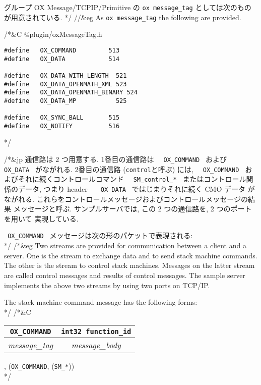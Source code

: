 グループ OX Message/TCPIP/Primitive の
{\tt ox message\_tag} としては次のものが用意されている.
*/
//&eg \noindent As {\tt ox message\_tag} the following are provided.

/*&C
@plugin/oxMessageTag.h
\begin{verbatim}
#define   OX_COMMAND         513
#define   OX_DATA            514

#define   OX_DATA_WITH_LENGTH  521
#define   OX_DATA_OPENMATH_XML 523
#define   OX_DATA_OPENMATH_BINARY 524
#define   OX_DATA_MP           525

#define   OX_SYNC_BALL       515
#define   OX_NOTIFY          516
\end{verbatim}
*/

/*&jp
通信路は 2 つ用意する.
1番目の通信路は
\verb+  OX_COMMAND +
および
\verb+   OX_DATA +
がながれる.
2番目の通信路 ({\tt control}と呼ぶ) には,
\verb+  OX_COMMAND + およびそれに続くコントロールコマンド
\verb+  SM_control_* +
またはコントロール関係のデータ, つまり header
\verb+   OX_DATA + ではじまりそれに続く CMO データ
がながれる.
これらをコントロールメッセージおよびコントロールメッセージの結果
メッセージと呼ぶ.
サンプルサーバでは, この 2 つの通信路を, 2 つのポートを用いて
実現している.


\verb+ OX_COMMAND + メッセージは次の形のパケットで表現される: \\
*/
/*&eg
Two streams are provided for communication between a client and a server.
One is the stream to exchange data and to send stack machine commands.
The other is the stream to control stack machines.
Messages on the latter stream are called control messages and
results of control messages. The sample server implements
the above two streams by using two ports on TCP/IP.

The stack machine command message has the following forms: \\
*/
/*&C
\noindent
\begin{tabular}{|c|c|}
\hline
{\tt OX\_COMMAND} & {\tt int32 function\_id} \\  \hline
{\it message\_tag} & {\it message\_body}
\\ \hline
\end{tabular}, \quad
({\tt OX\_COMMAND}, ({\tt SM\_*}))
\\
*/

